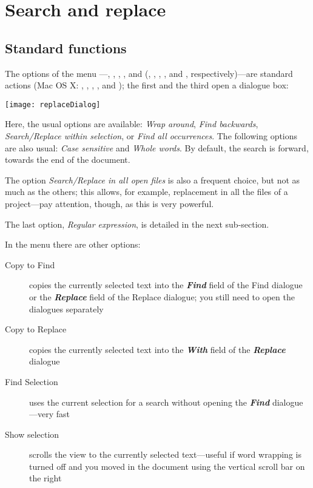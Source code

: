 \section{Search and replace}

\subsection{Standard functions}

The options of the menu ---, , , , and  (, , , , and , respectively)---are standard actions (Mac OS X: , , , , and ); the first and the third open a dialogue box:

\begin{center}
\texttt{[image: replaceDialog]}
\end{center}

Here, the usual options are available: \emph{Wrap around}, \emph{Find backwards}, \emph{Search/Replace within selection}, or \emph{Find all occurrences}. The following options are also usual: \emph{Case sensitive} and \emph{Whole words}. By default, the search is forward, towards the end of the document.

The option \emph{Search/Replace in all open files} is also a frequent choice, but not as much as the others; this allows, for example, replacement in all the files of a project---pay attention, though, as this is very powerful.

The last option, \emph{Regular expression}, is detailed in the next sub-section.

In the  menu there are other options:
\begin{description}
\item[Copy to Find] copies the currently selected text into the \textsl{\textbf{Find}} field of the Find dialogue or the \textsl{\textbf{Replace}} field of the Replace dialogue; you still need to open the dialogues separately
\item[Copy to Replace] copies the currently selected text into the \textsl{\textbf{With}} field of the \textsl{\textbf{Replace}} dialogue
\item[Find Selection] uses the current selection for a search without opening the \textsl{\textbf{Find}} dialogue---very fast
\item[Show selection] scrolls the view to the currently selected text---useful if word wrapping is turned off and you moved in the document using the vertical scroll bar on the right
\end{description}


